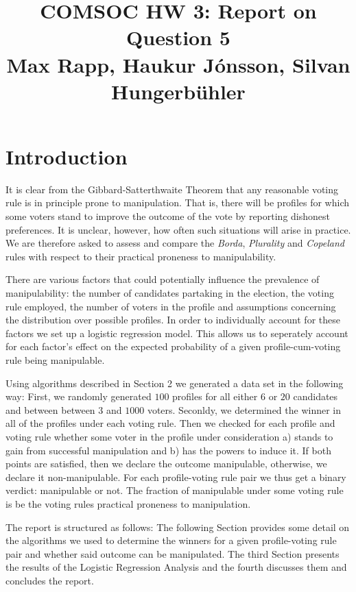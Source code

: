 \documentclass[10pt,a4paper]{article}
\title{%
	COMSOC HW 3: Report on Question 5 \\
	\large Max Rapp, Haukur J{\'o}nsson, Silvan Hungerb{\"u}hler}
\date{}
\begin{document}
	\maketitle
	\section{Introduction}
	It is clear from the Gibbard-Satterthwaite Theorem that any reasonable voting rule is in principle prone to manipulation. That is, there will be profiles for which some voters stand to improve the outcome of the vote by reporting dishonest preferences. It is unclear, however, how often such situations will arise in practice. We are therefore asked to assess and compare the \textit{Borda}, \textit{Plurality} and \textit{Copeland} rules with respect to their practical proneness to manipulability.
	
	There are various factors that could potentially influence the prevalence of manipulability: the number of candidates partaking in the election, the voting rule employed, the number of voters in the profile and assumptions concerning the distribution over possible profiles. In order to individually account for these factors we set up a logistic regression model. This allows us to seperately account for each factor's effect on the expected probability of a given profile-cum-voting rule being manipulable. 
	
	Using algorithms described in Section 2 we generated a data set in the following way:
	First, we randomly generated $100$ profiles for all either $6$ or $20$ candidates and between between $3$ and $1000$ voters.  Seconldy, we determined the winner in all of the profiles under each voting rule. Then we checked for each profile and voting rule whether some voter in the profile under consideration a) stands to gain from successful manipulation and b) has the powers to induce it. If both points are satisfied, then we declare the outcome manipulable, otherwise, we declare it non-manipulable. For each profile-voting rule pair we thus get a binary verdict: manipulable or not. The fraction of manipulable under some voting rule is be the voting rules practical proneness to manipulation.
	
	The report is structured as follows: The following Section provides some detail on the algorithms we used to determine the winners for a given profile-voting rule pair and whether said outcome can be manipulated. The third Section presents the results of the Logistic Regression Analysis and the fourth discusses them and concludes the report.
\end{document}
